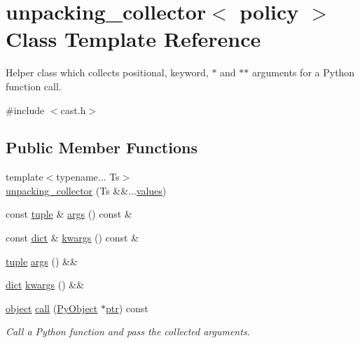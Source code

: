 \hypertarget{classunpacking__collector}{}\section{unpacking\+\_\+collector$<$ policy $>$ Class Template Reference}
\label{classunpacking__collector}


Helper class which collects positional, keyword, $\ast$ and $\ast$$\ast$ arguments for a Python function call.  




{\ttfamily \#include $<$cast.\+h$>$}

\subsection*{Public Member Functions}
\begin{DoxyCompactItemize}
\item 
{\footnotesize template$<$typename... Ts$>$ }\\\mbox{\hyperlink{classunpacking__collector_a8cc5fdce9ceb3faf99180e480efa0367}{unpacking\+\_\+collector}} (Ts \&\&...\mbox{\hyperlink{_s_d_l__opengl__glext_8h_a0aa8cf39c79d294b1d9f4daef5020bec}{values}})
\item 
const \mbox{\hyperlink{classtuple}{tuple}} \& \mbox{\hyperlink{classunpacking__collector_a8c2a4543599919b9d8b4c13a5cf6cf02}{args}} () const \&
\item 
const \mbox{\hyperlink{classdict}{dict}} \& \mbox{\hyperlink{classunpacking__collector_a14ceb5d3912c58d37b244dd5b7824aad}{kwargs}} () const \&
\item 
\mbox{\hyperlink{classtuple}{tuple}} \mbox{\hyperlink{classunpacking__collector_a9905f0fd4b68ab18f9df1fc495f369a9}{args}} () \&\&
\item 
\mbox{\hyperlink{classdict}{dict}} \mbox{\hyperlink{classunpacking__collector_ad623100e5a5b6ce8adb01dc8d86e5655}{kwargs}} () \&\&
\item 
\mbox{\hyperlink{classobject}{object}} \mbox{\hyperlink{classunpacking__collector_a3df5e4ecbc1a9fd31788c59053444de3}{call}} (\mbox{\hyperlink{_python27_2object_8h_aadc84ac7aed2cfa6f20c25f62bf3dac7}{Py\+Object}} $\ast$\mbox{\hyperlink{pystrtod_8h_a671b2e1a427060ad8b5362882ed58f5b}{ptr}}) const
\begin{DoxyCompactList}\small\item\em Call a Python function and pass the collected arguments. \end{DoxyCompactList}\end{DoxyCompactItemize}


